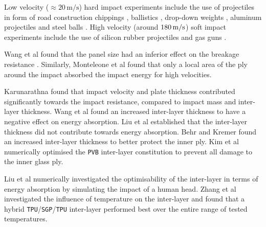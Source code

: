 \bigbreak
Low velocity ($\approx 20\,\mathrm{m}/\mathrm{s}$) hard impact experiments include the use of projectiles in form of road construction chippings \cite{Gra98}, ballistics \cite{Mon04}, drop-down weights \cite{Che15, Mil12, Wan18}, aluminum projectiles \cite{Mil12} and steel balls \cite{Beh99, Flo98, Wan18}. High velocity (around $180\, {\rm{m}}/{\rm{s}}$) soft impact experiments include the use of silicon rubber projectiles \cite{Moh17} and gas guns \cite{Moh18}.

\bigbreak
Wang et al \cite{Wan18} found that the panel size had an inferior effect on the breakage resistance \cite{Wan18}. Similarly, Monteleone et al \cite{Mon04} found that only a local area of the ply around the impact absorbed the impact energy for high velocities.

\bigbreak
Karunarathna \cite{Kar14} found that impact velocity and plate thickness contributed significantly towards the impact resistance, compared to impact mass and inter-layer thickness. Wang et al \cite{Wan18} found an increased inter-layer thickness to have a negative effect on energy absorption. Liu et al \cite{Liu16} established that the inter-layer thickness did not contribute towards energy absorption. Behr and Kremer \cite{Beh99} found an increased inter-layer thickness to better protect the inner ply. Kim et al \cite{Kim16} numerically optimised the \texttt{PVB} inter-layer constitution to prevent all damage to the inner glass ply.

\bigbreak
Liu et al \cite{Liu16} numerically investigated the optimisability of the inter-layer in terms of energy absorption by simulating the impact of a human head. Zhang et al \cite{Zha19} investigated the influence of temperature on the inter-layer and found that a hybrid \texttt{TPU}/\texttt{SGP}/\texttt{TPU} inter-layer performed best over the entire range of tested temperatures.